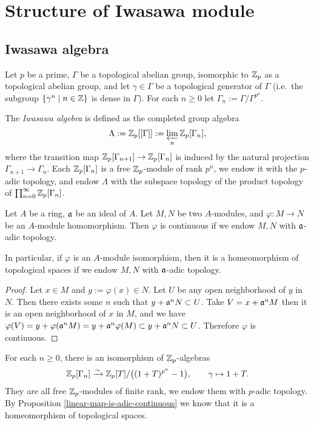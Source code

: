 \section{Structure of Iwasawa module}

\subsection{Iwasawa algebra}

Let $p$ be a prime,
$\Gamma$ be a topological abelian group, isomorphic to ${\mathbb {Z}}_p$
as a topological abelian group, and let $\gamma\in\Gamma$ be a topological generator
of $\Gamma$ (i.e.~the subgroup $\{\gamma^n\mid n\in{\mathbb {Z}}\}$ is dense in $\Gamma$).
For each $n\geq 0$ let $\Gamma_n:=\Gamma/\Gamma^{p^n}$.

\begin{definition}
\label{Iwasawa-alg-defn}
The \emph{Iwasawa algebra} is defined as the completed group algebra
$$
\Lambda:={\mathbb {Z}}_p[[\Gamma]]:=\varprojlim_n{\mathbb {Z}}_p[\Gamma_n],
$$
where the transition map ${\mathbb {Z}}_p[\Gamma_{n+1}]\to
{\mathbb {Z}}_p[\Gamma_n]$ is induced by the natural projection
$\Gamma_{n+1}\to\Gamma_n$.
Each ${\mathbb {Z}}_p[\Gamma_n]$ is a free ${\mathbb {Z}}_p$-module of rank $p^n$,
we endow it with the $p$-adic topology,
and endow $\Lambda$ with the subspace topology
of the product topology of $\prod_{n=0}^\infty{\mathbb {Z}}_p[\Gamma_n]$.
\end{definition}

\begin{prop}
\label{linear-map-is-adic-continuous}
Let $A$ be a ring, ${\mathfrak{a}}$ be an ideal of $A$.
Let $M,N$ be two $A$-modules,
and $\varphi:M\to N$ be an $A$-module homomorphism.
Then $\varphi$ is continuous if we endow $M,N$ with ${\mathfrak{a}}$-adic topology.

In particular, if $\varphi$ is an $A$-module isomorphism,
then it is a homeomorphism of topological spaces if we endow $M,N$ with ${\mathfrak{a}}$-adic topology.
\end{prop}

\begin{proof}
Let $x\in M$ and $y:=\varphi(x)\in N$.
Let $U$ be any open neighborhood of $y$ in $N$.
Then there exists some $n$ such that $y+{\mathfrak{a}}^nN\subset U$.
Take $V=x+{\mathfrak{a}}^nM$ then it is an open neighborhood of $x$ in $M$,
and we have $\varphi(V)=y+\varphi({\mathfrak{a}}^nM)=y+{\mathfrak{a}}^n\varphi(M)\subset y+{\mathfrak{a}}^nN\subset U$.
Therefore $\varphi$ is continuous.
\end{proof}

\begin{prop}
\label{Iwasawa-alg-isom-finite-level}
For each $n\geq 0$, there is an isomorphism of ${\mathbb {Z}}_p$-algebras
$$
{\mathbb {Z}}_p[\Gamma_n]\xrightarrow\sim{\mathbb {Z}}_p[T]/\big((1+T)^{p^n}-1\big),\qquad
\gamma\mapsto 1+T.
$$
They are all free ${\mathbb {Z}}_p$-modules of finite rank,
we endow them with $p$-adic topology.
By Proposition \ref{linear-map-is-adic-continuous}
we know that it is a homeomorphism of topological spaces.
\end{prop}

